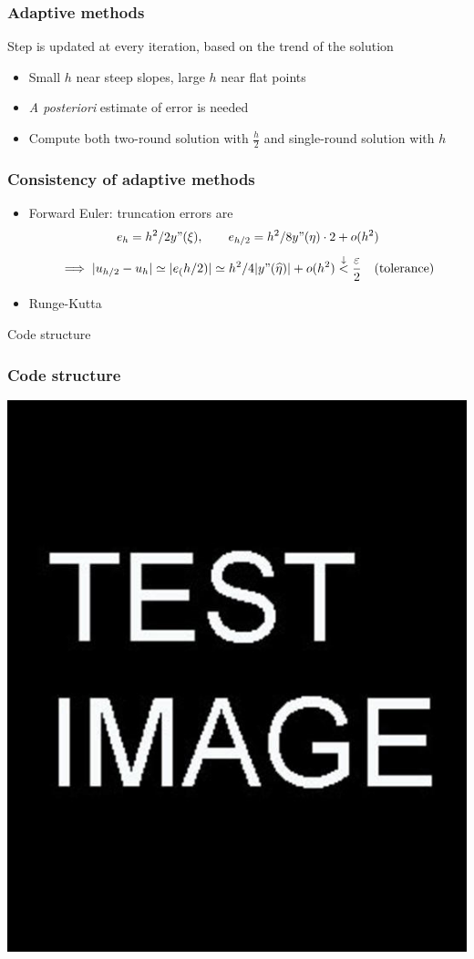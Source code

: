 \documentclass{beamer}
\begin{document}
\begin{frame} %
	\frametitle{Adaptive methods}
	Step is updated at every iteration, based on the trend of the solution
	\begin{itemize}
		\item Small $h$ near steep slopes, large $h$ near flat points %
		\item \textit{A posteriori} estimate of error is needed
		\item Compute both two-round solution with $\frac{h}{2}$ and single-round solution with $h$
	\end{itemize}
\end{frame}

\begin{frame} %
	\frametitle{Consistency of adaptive methods}
	\begin{itemize}
		\item Forward Euler: truncation errors are
		$$ e_h = h^2/2 y"(\xi), \qquad e_{h/2} = h^2/8 y"(\eta) \cdot 2 + o(h^2) $$
		$$\implies \lvert u_{h/2} - u_h\rvert \simeq \lvert e_(h/2)\rvert \simeq h^2/4 \lvert y"(\widehat\eta)\rvert
		+ o(h^2) \stackrel{\downarrow}{<} \frac{\varepsilon}{2}
		\quad \text{(tolerance)} $$
		\item Runge-Kutta %
	\end{itemize}
\end{frame}


\begin{frame} %
	Code structure %
\end{frame}


\begin{frame} %
	\frametitle{Code structure}
	\includegraphics[scale=0.3]{etc/test.jpg}
\end{frame}
\end{document}

